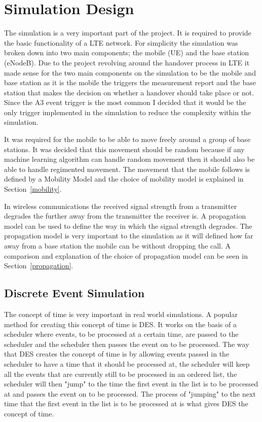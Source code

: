 \chapter{Simulation Design}
The simulation is a very important part of the project. It is required to provide the basic functionality of a LTE network. For simplicity the simulation was broken down into two main components; the mobile (UE) and the base station (eNodeB). Due to the project revolving around the handover process in LTE it made sense for the two main components on the simulation to be the mobile and base station as it is the mobile the triggers the measurement report and the base station that makes the decision on whether a handover should take place or not. Since the A3 event trigger is the most common I decided that it would be the only trigger implemented in the simulation to reduce the complexity within the simulation.

It was required for the mobile to be able to move freely around a group of base stations. It was decided that this movement should be random because if any machine learning algorithm can handle random movement then it should also be able to handle regimented movement. The movement that the mobile follows is defined by a Mobility Model and the choice of mobility model is explained in Section~\ref{mobility}.

In wireless communications the received signal strength from a transmitter degrades the further away from the transmitter the receiver is. A propagation model can be used to define the way in which the signal strength degrades. The propagation model is very important to the simulation as it will defined how far away from a base station the mobile can be without dropping the call. A comparison and explanation of the choice of propagation model can be seen in Section~\ref{propagation}.
\section{Discrete Event Simulation}
The concept of time is very important in real world simulations. A popular method for creating this concept of time is \ac{DES}. It works on the basis of a scheduler where events, to be processed at a certain time, are passed to the scheduler and the scheduler then passes the event on to be processed. The way that \ac{DES} creates the concept of time is by allowing events passed in the scheduler to have a time that it should be processed at, the scheduler will keep all the events that are currently still to be processed in an ordered list, the scheduler will then "jump" to the time the first event in the list is to be processed at and passes the event on to be processed. The process of "jumping" to the next time that the first event in the list is to be processed at is what gives \ac{DES} the concept of time.

